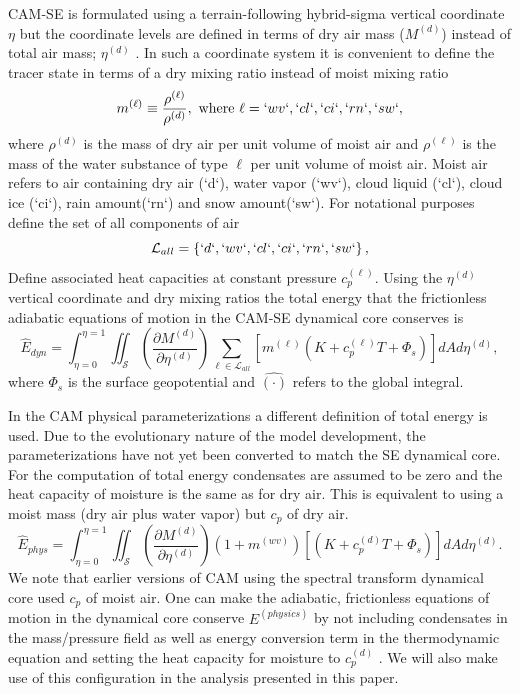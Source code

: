 \documentclass{agujournal}
\newcommand*{\gi}[1]{\widehat{#1}}
\begin{document}
CAM-SE is formulated using a terrain-following hybrid-sigma vertical coordinate $\eta$ but the coordinate levels are defined in terms of dry air mass ($M^{(d)}$) instead of total air mass; $\eta^{(d)}$ \citep[see ][ for details]{LetAl2018JAMES}. In such a coordinate system it is convenient to define the tracer state in terms of a dry mixing ratio instead of moist mixing ratio
\begin{equation}
m^{(\ell)}\equiv \frac{\rho^{(\ell)}}{\rho^{(d)}}, \text{ where }\ell=`wv`,`cl`,`ci`,`rn`,`sw`,\label{eq:mx}
\end{equation}
where $\rho^{(d)}$ is the mass of dry air per unit volume of moist air and $\rho^{(\ell)}$ is the mass of the water substance of type $\ell$ per unit volume of moist air. Moist air refers to air containing dry air (`d`), water vapor (`wv`), cloud liquid (`cl`), cloud ice (`ci`), rain amount(`rn`) and snow amount(`sw`). For notational purposes define the set of all components of air
\begin{equation}
\mathcal{L}_{all}=\left\{ `d`,`wv`,`cl`,`ci`,`rn`,`sw`\right\},
\end{equation}
Define associated heat capacities at constant pressure $c_p^{(\ell)}$. Using the $\eta^{(d)}$ vertical coordinate and dry mixing ratios the total energy that the frictionless adiabatic equations of motion in the CAM-SE dynamical core conserves is 
\begin{equation}
\gi{E}_{dyn}=\int_{\eta=0}^{\eta=1} \iint_\mathcal{S} \left( \frac{\partial M^{(d)}}{\partial \eta^{(d)}} \right)\sum_{\ell \in \mathcal{L}_{all}} \left[m^{(\ell)} \left(K+c_p^{(\ell)}T+\Phi_s  \right)\right]  dA d \eta^{(d)},\label{eq:comprehensice_energy}
\end{equation}
where $\Phi_s$ is the surface geopotential and $\gi{(\cdot)}$ refers to the global integral.

In the CAM physical parameterizations a different definition of total energy is used. Due to the evolutionary nature of the model development, the parameterizations have not yet been converted to match the SE dynamical core. For the computation of total energy condensates are assumed to be zero and the heat capacity of moisture is the same as for dry air. This is equivalent to using a moist mass (dry air plus water vapor) but $c_p$ of dry air.
\begin{equation}
\label{eq:Ephys}
\gi{E}_{phys} =\int_{\eta=0}^{\eta=1} \iint_\mathcal{S} \left( \frac{\partial M^{(d)}}{\partial \eta^{(d)}} \right)\left(1+m^{(wv)}\right)\left[ \left(K+c_p^{(d)}T+\Phi_s\right)\right]dA d \eta^{(d)}.
\end{equation}
We note that earlier versions of CAM using the spectral transform dynamical core used $c_p$ of moist air. 
One can make the adiabatic, frictionless equations of motion in the dynamical core conserve $E^{(physics)}$ by not including condensates in the mass/pressure field as well as energy conversion term in the thermodynamic equation and setting the heat capacity for moisture to $c_p^{(d)}$ \citep{T2011LNCSEb}. We will also make use of this configuration in the analysis presented in this paper.
\end{document}
